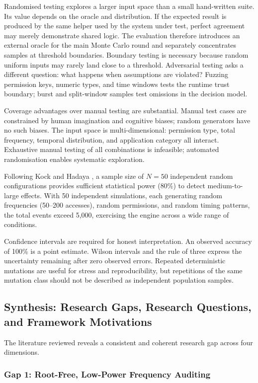 Randomised testing explores a larger input space than a small hand-written suite. Its value depends on the oracle and distribution. If the expected result is produced by the same helper used by the system under test, perfect agreement may merely demonstrate shared logic. The evaluation therefore introduces an external oracle for the main Monte Carlo round and separately concentrates samples at threshold boundaries. Boundary testing is necessary because random uniform inputs may rarely land close to a threshold. Adversarial testing asks a different question: what happens when assumptions are violated? Fuzzing permission keys, numeric types, and time windows tests the runtime trust boundary; burst and split-window samples test omissions in the decision model.

Coverage advantages over manual testing are substantial. Manual test cases are constrained by human imagination and cognitive biases; random generators have no such biases. The input space is multi-dimensional: permission type, total frequency, temporal distribution, and application category all interact. Exhaustive manual testing of all combinations is infeasible; automated randomisation enables systematic exploration.

Following Kock and Hadaya \cite{47}, a sample size of \(N=50\) independent random configurations provides sufficient statistical power (80\%) to detect medium-to-large effects. With 50 independent simulations, each generating random frequencies (50--200 accesses), random permissions, and random timing patterns, the total events exceed 5,000, exercising the engine across a wide range of conditions.

Confidence intervals are required for honest interpretation. An observed accuracy of 100\% is a point estimate. Wilson intervals and the rule of three express the uncertainty remaining after zero observed errors. Repeated deterministic mutations are useful for stress and reproducibility, but repetitions of the same mutation class should not be described as independent population samples.

\subsection{Synthesis: Research Gaps, Research Questions, and Framework Motivations}

The literature reviewed reveals a consistent and coherent research gap across four dimensions.

\subsubsection{Gap 1: Root-Free, Low-Power Frequency Auditing}

